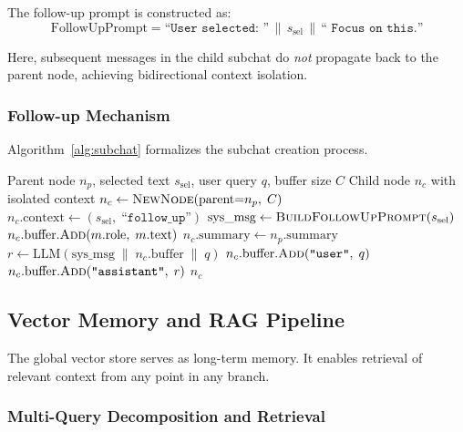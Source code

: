 \documentclass[pdflatex,sn-mathphys-num]{sn-jnl}%
\theoremstyle{thmstyleone}%
\theoremstyle{thmstyletwo}%
\theoremstyle{thmstylethree}%
\begin{document}
The follow-up prompt is constructed as:
\begin{equation}
\text{FollowUpPrompt} = \texttt{``User selected:~''} \,\|\, s_{\text{sel}} \,\|\, \texttt{``~Focus on this.''}
\label{eq:followup}
\end{equation}

Here, subsequent messages in the child subchat do \emph{not} propagate back to the parent node, achieving bidirectional context isolation.

\subsubsection{Follow-up Mechanism}\label{subsubsec:followup_alg}

Algorithm~\ref{alg:subchat} formalizes the subchat creation process.

\begin{algorithm}[htbp]
\caption{Follow-up Subchat Creation}\label{alg:subchat}
\begin{algorithmic}[1]
\Require Parent node $n_p$, selected text $s_{\text{sel}}$, user query $q$, buffer size $C$
\Ensure Child node $n_c$ with isolated context
\State $n_c \gets \textsc{NewNode}(\text{parent}{=}n_p,\; C)$
\State $n_c.\text{context} \gets (s_{\text{sel}},\; \texttt{``follow\_up''})$
\State $\text{sys\_msg} \gets \textsc{BuildFollowUpPrompt}(s_{\text{sel}})$
    \State $n_c.\text{buffer}.\textsc{Add}(m.\text{role},\; m.\text{text})$ 
\EndFor
\State $n_c.\text{summary} \gets n_p.\text{summary}$ 
\State $r \gets \text{LLM}\!\left(\text{sys\_msg} \;\|\; n_c.\text{buffer} \;\|\; q\right)$
\State $n_c.\text{buffer}.\textsc{Add}(\texttt{``user''},\; q)$
\State $n_c.\text{buffer}.\textsc{Add}(\texttt{``assistant''},\; r)$
\State \Return $n_c$
\end{algorithmic}
\end{algorithm}

\subsection{Vector Memory and RAG Pipeline}\label{subsec:rag}

The global vector store serves as long-term memory. It enables retrieval of relevant context from any point in any branch.

\subsubsection{Multi-Query Decomposition and Retrieval}\label{subsubsec:decomposition}
\end{document}
